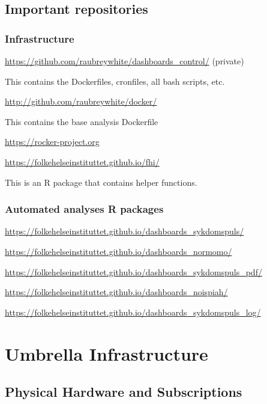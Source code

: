 \documentclass[12pt,]{article}
\begin{document}
\subsection{Important repositories}\label{important-repositories}

\subsubsection{Infrastructure}\label{infrastructure}

\url{https://github.com/raubreywhite/dashboards_control/} (private)

This contains the Dockerfiles, cronfiles, all bash scripts, etc.

\url{http://github.com/raubreywhite/docker/}

This contains the base analysis Dockerfile

\url{https://rocker-project.org}

\url{https://folkehelseinstituttet.github.io/fhi/}

This is an R package that contains helper functions.

\subsubsection{Automated analyses R
packages}\label{automated-analyses-r-packages}

\url{https://folkehelseinstituttet.github.io/dashboards_sykdomspuls/}

\url{https://folkehelseinstituttet.github.io/dashboards_normomo/}

\url{https://folkehelseinstituttet.github.io/dashboards_sykdomspuls_pdf/}

\url{https://folkehelseinstituttet.github.io/dashboards_noispiah/}

\url{https://folkehelseinstituttet.github.io/dashboards_sykdomspuls_log/}

\section{Umbrella Infrastructure}\label{umbrella-infrastructure}

\subsection{Physical Hardware and
Subscriptions}\label{physical-hardware-and-subscriptions}
\end{document}
